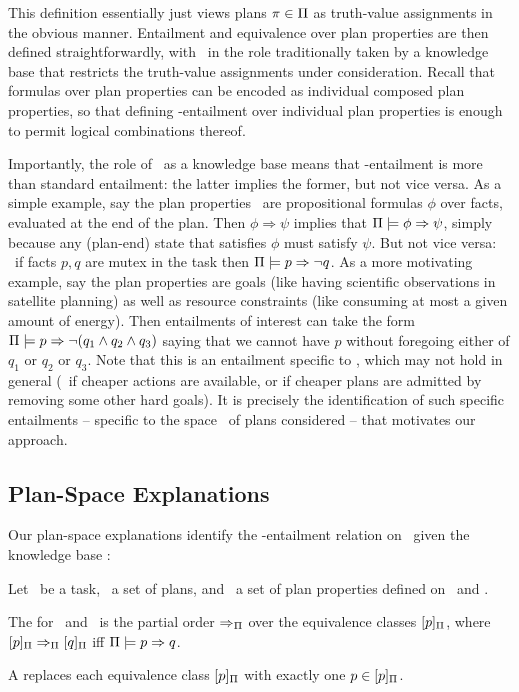 This definition essentially just views plans $\pi \in \Pi$ as
truth-value assignments in the obvious manner. Entailment and
equivalence over plan properties are then defined straightforwardly,
with \plans\ in the role traditionally taken by a knowledge base that
restricts the truth-value assignments under consideration. Recall that
formulas over plan properties can be encoded as individual composed
plan properties, so that defining \plans-entailment over individual plan
properties is enough to permit logical combinations thereof.

Importantly, the role of \plans\ as a knowledge base means that
\plans-entailment is more than standard entailment: the latter implies
the former, but not vice versa. As a simple example, say the plan
properties \props\ are propositional formulas $\phi$ over facts,
evaluated at the end of the plan. Then $\phi \Rightarrow \psi$ implies
that $\Pi \models \phi \Rightarrow \psi$, simply because any (plan-end)
state that satisfies $\phi$ must satisfy $\psi$. But not vice versa:
\eg\ if facts $p, q$ are mutex in the task then
$\Pi \models p \Rightarrow \neg q$. As a more motivating example, say the
plan properties are goals (like having scientific observations in
satellite planning) as well as resource constraints (like consuming at
most a given amount of energy). Then entailments of interest can take
the form $\Pi \models p \Rightarrow \neg (q_1 \wedge q_2 \wedge q_3)$
saying that we cannot have $p$ without foregoing either of $q_1$ or
$q_2$ or $q_3$. Note that this is an entailment specific to \plans,
which may not hold in general (\eg\ if cheaper actions are available,
or if cheaper plans are admitted by removing some other hard
goals). It is precisely the identification of such specific
entailments -- specific to the space \plans\ of plans considered --
that motivates our approach.





\subsection{Plan-Space Explanations}

Our plan-space explanations identify the \plans-entailment relation on
\props\ given the knowledge base \plans:

\begin{definition}
Let \task\ be a task, \plans\ a set of plans, and \props\ a set of
plan properties defined on \task\ and \plans.

The  for \plans\ and
\props\ is the partial order $\Rightarrow_{\Pi}$ over the equivalence
classes $[p]_{\Pi}$, where $[p]_{\Pi}
\Rightarrow_{\Pi} [q]_{\Pi}$ iff
$\Pi \models p \Rightarrow q$.

A  replaces each equivalence class
$[p]_{\Pi}$ with exactly one $p \in
[p]_{\Pi}$.
\end{definition}

